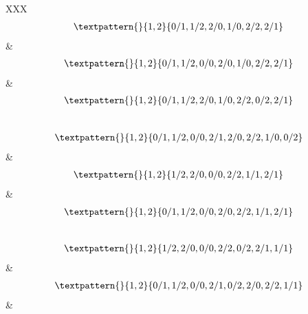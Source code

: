 \begin{center}
\begin{longtabu}[l]{XXX}
\begin{equation}
	\begin{gathered}
		\textpattern{}{1,2}{0/1,1/2,2/0,1/0,2/2,2/1}
	\end{gathered}
	\label{cls:206}
\end{equation}
    &
\begin{equation}
	\begin{gathered}
		\textpattern{}{1,2}{0/1,1/2,0/0,2/0,1/0,2/2,2/1}
	\end{gathered}
	\label{cls:207}
\end{equation}
    &
\begin{equation}
	\begin{gathered}
		\textpattern{}{1,2}{0/1,1/2,2/0,1/0,2/2,0/2,2/1}
	\end{gathered}
	\label{cls:208}
\end{equation}
\\
\begin{equation}
	\begin{gathered}
		\textpattern{}{1,2}{0/1,1/2,0/0,2/1,2/0,2/2,1/0,0/2}
	\end{gathered}
	\label{cls:209}
\end{equation}
    &
\begin{equation}
	\begin{gathered}
		\textpattern{}{1,2}{1/2,2/0,0/0,2/2,1/1,2/1}
	\end{gathered}
	\label{cls:210}
\end{equation}
    &
\begin{equation}
	\begin{gathered}
		\textpattern{}{1,2}{0/1,1/2,0/0,2/0,2/2,1/1,2/1}
	\end{gathered}
	\label{cls:211}
\end{equation}
\\
\begin{equation}
	\begin{gathered}
		\textpattern{}{1,2}{1/2,2/0,0/0,2/2,0/2,2/1,1/1}
	\end{gathered}
	\label{cls:212}
\end{equation}
    &
\begin{equation}
	\begin{gathered}
		\textpattern{}{1,2}{0/1,1/2,0/0,2/1,0/2,2/0,2/2,1/1}
	\end{gathered}
	\label{cls:213}
\end{equation}
    &
\begin{equation}
	\begin{gathered}

\end{gathered}
\end{equation}
\end{longtabu}
\end{center}
